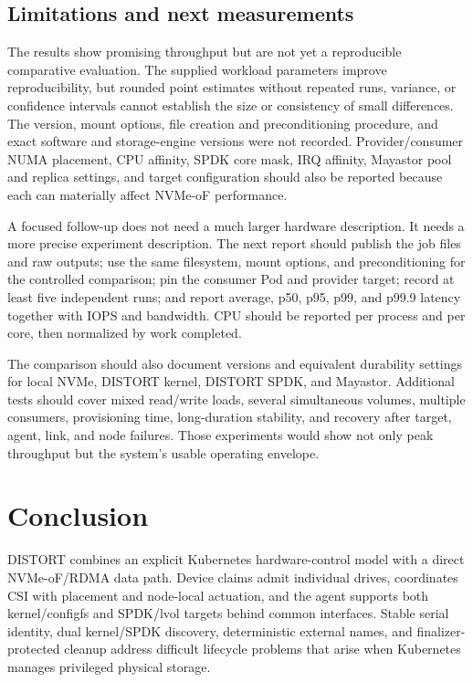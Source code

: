 \documentclass[10pt,a4paper,twocolumn]{article}
\newcommand{\distort}{DISTORT}
\newcommand{\code}[1]{\texttt{\detokenize{#1}}}
\begin{document}
\subsection{Limitations and next measurements}

The results show promising throughput but are not yet a reproducible
comparative evaluation. The supplied workload parameters improve
reproducibility, but rounded point estimates without repeated runs, variance,
or confidence intervals cannot establish the size or consistency of small
differences. The \code{fio} version, mount options, file creation and
preconditioning procedure, and exact software and storage-engine versions were
not recorded. Provider/consumer NUMA placement, CPU affinity, SPDK core mask,
IRQ affinity, Mayastor pool and replica settings, and target configuration
should also be reported because each can materially affect NVMe-oF
performance.

A focused follow-up does not need a much larger hardware description. It needs
a more precise experiment description. The next report should publish the
\code{fio} job files and raw outputs; use the same filesystem, mount options,
and preconditioning for the controlled comparison; pin the consumer Pod and
provider target; record at least five independent runs; and report average,
p50, p95, p99, and p99.9 latency together with IOPS and bandwidth. CPU should
be reported per process and per core, then normalized by work completed.

The comparison should also document versions and equivalent durability
settings for local NVMe, \distort{} kernel, \distort{} SPDK, and Mayastor.
Additional tests should cover mixed read/write loads, several simultaneous
volumes, multiple consumers, provisioning time, long-duration stability, and
recovery after target, agent, link, and node failures. Those experiments would
show not only peak throughput but the system's usable operating envelope.

\balance
\section*{Conclusion}

\distort{} combines an explicit Kubernetes hardware-control model with a
direct NVMe-oF/RDMA data path. Device claims admit individual drives,
\code{NVMePartition} coordinates CSI with placement and node-local actuation,
and the agent supports both kernel/configfs and SPDK/lvol targets behind common
interfaces. Stable serial identity, dual kernel/SPDK discovery, deterministic
external names, and finalizer-protected cleanup address difficult lifecycle
problems that arise when Kubernetes manages privileged physical storage.
\end{document}
